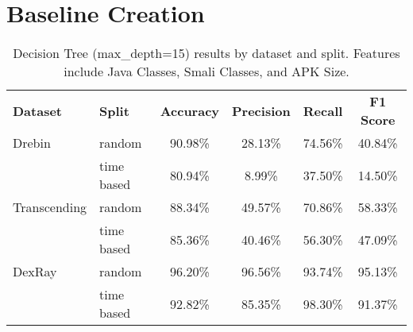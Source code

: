 \newpage

\section{Baseline Creation}\label{AppendixBaselineCreation}

\vspace{0em} %

\begin{table}[h!]
    \caption{\label{tab:decisiontree}%
    Decision Tree (max\_depth=15) results by dataset and split. Features include Java Classes, Smali Classes, and APK Size.}
    \centering
    \small %
    \begin{tabular}{@{}llcccc@{}}
    \toprule
    \textbf{Dataset} & \textbf{Split} & \textbf{Accuracy} & \textbf{Precision} & \textbf{Recall} & \textbf{F1 Score} \\ \cmidrule(r){1-2} \cmidrule(lr){3-6}
    Drebin         & random     & 90.98\% & 28.13\% & 74.56\% & 40.84\% \\
                   & time based & 80.94\% & 8.99\%  & 37.50\% & 14.50\% \\ \addlinespace
    Transcending   & random     & 88.34\% & 49.57\% & 70.86\% & 58.33\% \\
                   & time based & 85.36\% & 40.46\% & 56.30\% & 47.09\% \\ \addlinespace
    DexRay         & random     & 96.20\% & 96.56\% & 93.74\% & 95.13\% \\
                   & time based & 92.82\% & 85.35\% & 98.30\% & 91.37\% \\
    \bottomrule
    \end{tabular}
\end{table}

\vspace{3em} %

